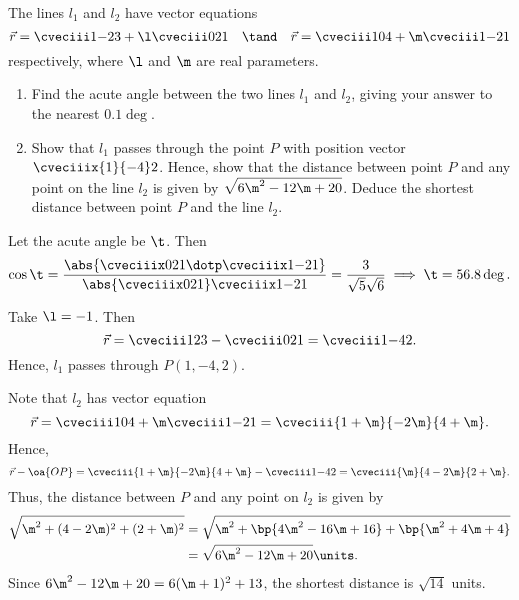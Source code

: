 \begin{problem}
    The lines $l_1$ and $l_2$ have vector equations \[\vec r = \cveciii1{-2}3 + \l \cveciii021 \quad \tand \quad \vec r = \cveciii104 + \m \cveciii1{-2}1\] respectively, where $\l$ and $\m$ are real parameters.

    \begin{enumerate}
        \item Find the acute angle between the two lines $l_1$ and $l_2$, giving your answer to the nearest $0.1\deg$.
        \item Show that $l_1$ passes through the point $P$ with position vector $\cveciiix{1}{-4}2$. Hence, show that the distance between point $P$ and any point on the line $l_2$ is given by $\sqrt{6\m^2 - 12\m + 20}$. Deduce the shortest distance between point $P$ and the line $l_2$.
    \end{enumerate}
\end{problem}
\begin{solution}
    \begin{ppart}
        Let the acute angle be $\t$. Then \[\cos \t = \frac{\abs{\cveciiix021 \dotp \cveciiix1{-2}1}}{\abs{\cveciiix021} \cveciiix1{-2}{1}} = \frac{3}{\sqrt5 \sqrt6} \implies \t = 56.8\deg.\]
    \end{ppart}
    \begin{ppart}
        Take $\l = -1$. Then \[\vec r = \cveciii123 - \cveciii021 = \cveciii1{-4}2.\] Hence, $l_1$ passes through $P(1, -4, 2)$.

        Note that $l_2$ has vector equation \[\vec r = \cveciii104 + \m \cveciii1{-2}{1} = \cveciii{1 + \m}{-2\m}{4 + \m}.\] Hence, \[\vec r - \oa{OP} = \cveciii{1 + \m}{-2\m}{4 + \m} - \cveciii1{-4}{2} = \cveciii{\m}{4 -2\m}{2 + \m}.\] Thus, the distance between $P$ and any point on $l_2$ is given by
        \begin{align*}
            \sqrt{\m^2 + (4-2 \m)^2 + (2+\m)^2} &= \sqrt{\m^2 + \bp{4\m^2 - 16\m + 16} + \bp{\m^2 + 4\m + 4}}\\
            &= \sqrt{6\m^2 - 12 \m + 20} \units.
        \end{align*}
        Since $6\m^2 - 12 \m + 20 = 6(\m + 1)^2 + 13$, the shortest distance is $\sqrt{14}$ units.
    \end{ppart}
\end{solution}

